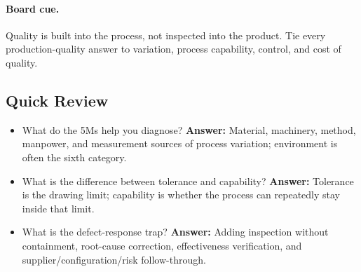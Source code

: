 \documentclass[../main.tex]{subfiles}
\begin{document}
\paragraph{Board cue.}
Quality is built into the process, not inspected into the product.  Tie every
production-quality answer to variation, process capability, control, and cost
of quality.

\subsection{Quick Review}
\begin{itemize}
  \item What do the 5Ms help you diagnose? \textbf{Answer:} Material, machinery, method, manpower, and measurement sources of process variation; environment is often the sixth category.
  \item What is the difference between tolerance and capability? \textbf{Answer:} Tolerance is the drawing limit; capability is whether the process can repeatedly stay inside that limit.
  \item What is the defect-response trap? \textbf{Answer:} Adding inspection without containment, root-cause correction, effectiveness verification, and supplier/configuration/risk follow-through.
\end{itemize}

\end{document}
